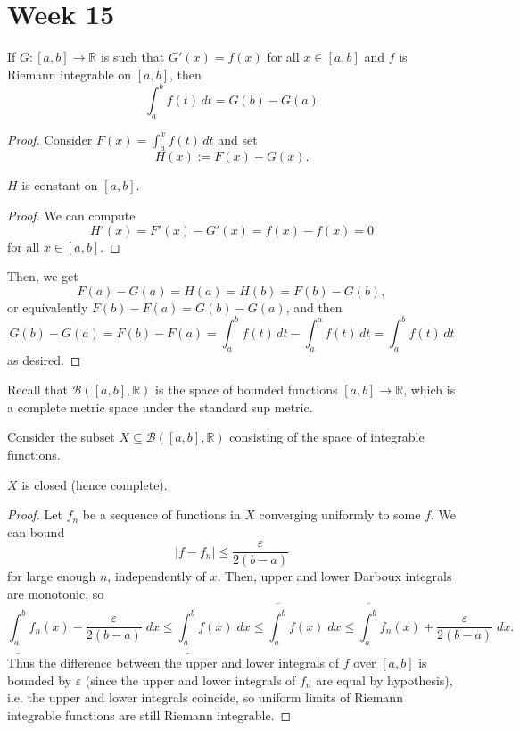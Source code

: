 \documentclass[10pt]{scrartcl}
\providecommand{\eps}{\varepsilon}
\providecommand{\RR}{\mathbb R}
\providecommand{\dif}{\;d}
\begin{document}
\setcounter{section}{14}
\section{Week 15}
\begin{theorem}
	If $G\colon[a,b]\to\RR$ is such that $G'(x) = f(x)$
	for all $x\in[a,b]$ and $f$ is Riemann integrable on $[a,b]$, then
	\[\int_a^b f(t)\,dt = G(b) - G(a)\]
\end{theorem}

\begin{proof}
	Consider $F(x) = \int_a^x f(t)\,dt$ and set
	\[H(x) := F(x) - G(x).\]
	\begin{claim}
		$H$ is constant on $[a,b]$.
	\end{claim}
	\begin{proof}
		We can compute
		\[H'(x) = F'(x) - G'(x) = f(x) - f(x) = 0\]
		for all $x\in[a,b]$.
	\end{proof}
	
	Then, we get
	\[F(a) - G(a) = H(a) = H(b) = F(b) - G(b),\]
	or equivalently $F(b) - F(a) = G(b) - G(a)$, and then
	\[G(b) - G(a) = F(b) - F(a)
	= \int_a^b f(t)\,dt - \int_a^a f(t)\,dt = \int_a^b f(t)\,dt\]
	as desired.
\end{proof}

Recall that $\mathcal B([a,b],\RR)$ is the space of bounded functions
$[a,b]\to\RR$, which is a complete metric space under the standard sup metric.

Consider the subset $X\subseteq \mathcal B([a,b],\RR)$
consisting of the space of integrable functions.

\begin{theorem}
	$X$ is closed (hence complete).
\end{theorem}
\begin{proof}
	Let $f_n$ be a sequence of functions in $X$ converging uniformly to some $f$.
	We can bound
	\[|f - f_n| \le \frac{\eps}{2(b-a)}\]
	for large enough $n$, independently of $x$. Then,
	upper and lower Darboux integrals are monotonic, so
	\[\underline{\int_a^b} f_n(x) - \frac{\eps}{2(b-a)}\dif x
	\le \underline{\int_a^b} f(x)\dif x
	\le \overline{\int_a^b} f(x)\dif x
	\le \overline{\int_a^b} f_n(x) + \frac{\eps}{2(b-a)}\dif x.\]
	Thus the difference between the upper and lower integrals
	of $f$ over $[a, b]$ is bounded by $\eps$
	(since the upper and lower integrals of $f_n$ are equal by hypothesis),
	i.e. the upper and lower integrals coincide, so
	uniform limits of Riemann integrable functions are still Riemann integrable.
\end{proof}
\end{document}
